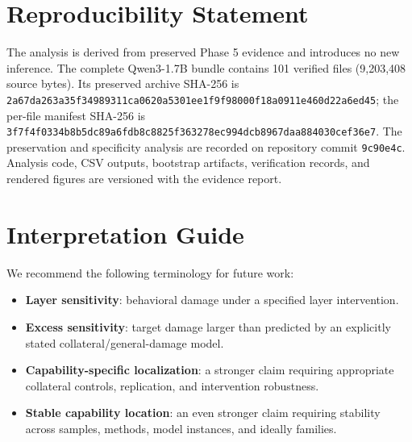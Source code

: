 \documentclass[10pt,twocolumn]{article}
\begin{document}
\section*{Reproducibility Statement}
The analysis is derived from preserved Phase 5 evidence and introduces no new inference. The complete Qwen3-1.7B bundle contains 101 verified files (9,203,408 source bytes). Its preserved archive SHA-256 is \texttt{2a67da263a35f34989311ca0620a5301}\-\texttt{ee1f9f98000f18a0911e460d22a6ed45}; the per-file manifest SHA-256 is \texttt{3f7f4f0334b8b5dc89a6fdb8c8825f3}\-\texttt{63278ec994dcb8967daa884030cef36e7}. The preservation and specificity analysis are recorded on repository commit \texttt{9c90e4c}. Analysis code, CSV outputs, bootstrap artifacts, verification records, and rendered figures are versioned with the evidence report.

\appendix
\section{Interpretation Guide}
We recommend the following terminology for future work:
\begin{itemize}
\item \textbf{Layer sensitivity}: behavioral damage under a specified layer intervention.
\item \textbf{Excess sensitivity}: target damage larger than predicted by an explicitly stated collateral/general-damage model.
\item \textbf{Capability-specific localization}: a stronger claim requiring appropriate collateral controls, replication, and intervention robustness.
\item \textbf{Stable capability location}: an even stronger claim requiring stability across samples, methods, model instances, and ideally families.
\end{itemize}
\end{document}

